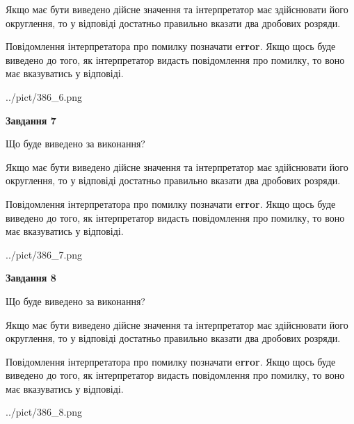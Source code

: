 \documentclass[12pt, ukrainian]{article}
\begin{document}
{\begin {Large}
Якщо має бути виведено дійсне значення та інтерпретатор має здійснювати його округлення, 
то у відповіді достатньо правильно вказати два дробових розряди.

Повідомлення інтерпретатора про помилку позначати \textbf{error}.
Якщо щось буде виведено до того, як інтерпретатор видасть повідомлення про помилку, 
то воно має вказуватись у відповіді. \par

\begin{center}
	{../pict/386_6.png}
\end{center}
\newpage

{\begin {center}\textbf{Завдання 7}\end {center}}\par
Що буде виведено за виконання? \par

Якщо має бути виведено дійсне значення та інтерпретатор має здійснювати його округлення, 
то у відповіді достатньо правильно вказати два дробових розряди.

Повідомлення інтерпретатора про помилку позначати \textbf{error}.
Якщо щось буде виведено до того, як інтерпретатор видасть повідомлення про помилку, 
то воно має вказуватись у відповіді. \par

\begin{center}
	{../pict/386_7.png}
\end{center}
\newpage

{\begin {center}\textbf{Завдання 8}\end {center}}\par
Що буде виведено за виконання? \par

Якщо має бути виведено дійсне значення та інтерпретатор має здійснювати його округлення, 
то у відповіді достатньо правильно вказати два дробових розряди.

Повідомлення інтерпретатора про помилку позначати \textbf{error}.
Якщо щось буде виведено до того, як інтерпретатор видасть повідомлення про помилку, 
то воно має вказуватись у відповіді. \par

\begin{center}
	{../pict/386_8.png}
\end{center}
\newpage


\end{Large}}
\end{document}
